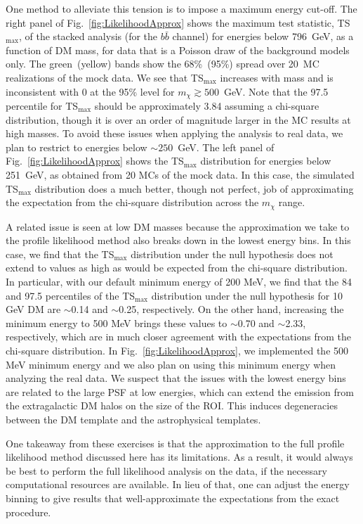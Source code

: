 One method to alleviate this tension is to impose a maximum energy cut-off.   The right panel of Fig.~\ref{fig:LikelihoodApprox} shows the maximum test statistic, TS$_\text{max}$, of the stacked analysis (for the $b\bar{b}$ channel) for energies below 796~GeV, as a function of DM mass, for data that is a Poisson draw of the background models only.  The green~(yellow) bands show the 68\%~(95\%) spread over 20~MC realizations of the mock data.  We see that TS$_\text{max}$ increases with mass and is inconsistent with 0 at the 95\% level for $m_\chi \gtrsim 500$~GeV.  Note that the 97.5 percentile for TS$_\text{max}$ should be approximately 3.84 assuming a chi-square distribution, though it is over an order of magnitude larger in the MC results at high masses.  To avoid these issues when applying the analysis to real data, we plan to restrict to energies below $\sim$$250$~GeV. The left panel of Fig.~\ref{fig:LikelihoodApprox} shows the TS$_\text{max}$ distribution for energies below 251~GeV, as obtained from 20 MCs of the mock data.  In this case, the simulated TS$_\text{max}$ distribution does a much better, though not perfect, job of approximating the expectation from the chi-square distribution across the $m_\chi$ range.

A related issue is seen at low DM masses because the approximation we take to the profile likelihood method also breaks down in the lowest energy bins.  In this case, we find that the TS$_\text{max}$ distribution under the null hypothesis does not extend to values as high as would be expected from the chi-square distribution.  In particular, with our default minimum energy of 200 MeV, we find that the 84 and 97.5 percentiles of the TS$_\text{max}$ distribution under the null hypothesis for 10 GeV DM are $\sim$0.14 and $\sim$0.25, respectively.  On the other hand, increasing the minimum energy to 500 MeV brings these values to $\sim$0.70 and $\sim$2.33, respectively, which are in much closer agreement with the expectations from the chi-square distribution.  In Fig.~\ref{fig:LikelihoodApprox}, we implemented the 500 MeV minimum energy and we also plan on using this minimum energy when analyzing the real data.  We suspect that the issues with the lowest energy bins are related to the large PSF at low energies, which can extend the emission from the extragalactic DM halos on the size of the ROI.  This induces degeneracies between the DM template and the astrophysical templates.


One takeaway from these exercises is that the approximation to the full profile likelihood method discussed here has its limitations.  As a result, it would always be best to perform the full likelihood analysis on the data, if the necessary  computational resources are available.   
In lieu of that, one can adjust the energy binning to give results that well-approximate the expectations from the exact procedure.
 
